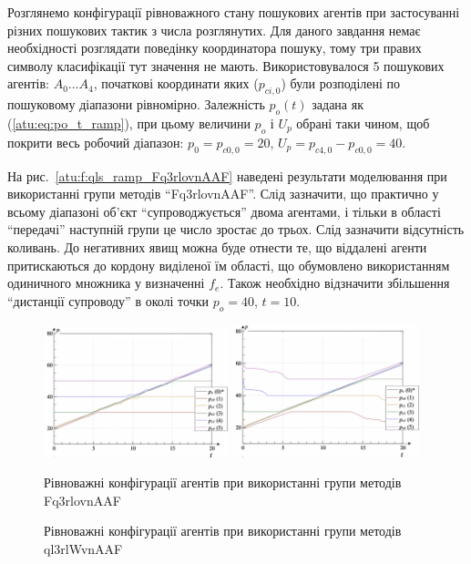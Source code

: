 \documentclass[a4paper,13pt]{atuaref}
\begin{document}
Розглянемо конфігурації рівноважного стану пошукових агентів при застосуванні
різних пошукових тактик з числа розглянутих. Для даного завдання немає
необхідності розглядати поведінку координатора пошуку, тому три правих символу
класифікації тут значення не мають.
Використовувалося 5 пошукових агентів: $A_0 \ldots A_4$, початкові
координати яких ($p_{ci,0}$) були розподілені по пошуковому діапазони
рівномірно. Залежність $p_o (t)$ задана як (\ref{atu:eq:po_t_ramp}), при
цьому величини $p_o$ і $U_p$ обрані таки чином, щоб покрити весь робочий
діапазон: $p_0 = p_{c0,0} = 20$, $U_p = p_{c4,0} - p_{c0,0} = 40$.


На рис.~\ref{atu:f:qls_ramp_Fq3rlovnAAF} наведені результати моделювання при використанні групи методів
``Fq3rlovnAAF''. Слід зазначити, що практично у всьому діапазоні об'єкт
``супроводжується'' двома агентами, і тільки в області ``передачі'' наступній
групи це число зростає до трьох. Слід зазначити відсутність коливань. До
негативних явищ можна буде отнести те, що віддалені агенти притискаються до
кордону виділеної їм області, що обумовлено використанням одиничного множника у
визначенні $f_e$. Також необхідно відзначити збільшення
``дистанції супроводу'' в околі точки $p_o = 40$, $t = 10$.

\begin{figure}[htb!]
    \includegraphics[width=0.48\textwidth]{p3/p/ramp/qls-p_t_pi_Fq3rlovnAAF_ramp_xl.png} \hfill
    \includegraphics[width=0.48\textwidth]{p3/p/ramp/qls-p_t_pi_ql3rlWvnAAF_ramp_xl.png}
  \\
  \parbox[t]{0.48\textwidth} {
    \caption{Рівноважні конфігурації агентів при використанні групи методів  Fq3rlovnAAF}
    \label{atu:f:qls_ramp_Fq3rlovnAAF}
  }
  \hfill
  \parbox[t]{0.48\textwidth} {
    \caption{Рівноважні конфігурації агентів при використанні групи методів ql3rlWvnAAF}
    \label{atu:f:qls_ramp_ql3rlWvnAAF}
  }
\end{figure}
\end{document}
